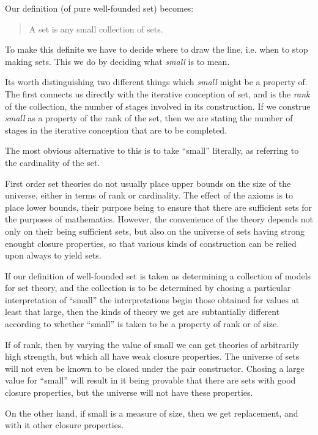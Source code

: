\documentclass[10pt,titlepage]{book}
\begin{document}
Our definition (of pure well-founded set) becomes:

\begin{quote}
A set is any small collection of sets.
\end{quote}

To make this definite we have to decide where to draw the line, i.e. when to stop making sets.
This we do by deciding what {\it small} is to mean.

Its worth distinguishing two different things which {\it small} might be a property of.
The first connects us directly with the iterative conception of set, and is the {\it rank} of the collection, the number of stages involved in its construction.
If we construe {\it small} as a property of the rank of the set, then we are stating the number of stages in the iterative conception that are to be completed.

The most obvious alternative to this is to take ``small'' literally, as referring to the cardinality of the set.

First order set theories do not usually place upper bounds on the size of the universe, either in terms of rank or cardinality.
The effect of the axioms is to place lower bounds, their purpose being to ensure that there are sufficient sets for the purposes of mathematics.
However, the convenience of the theory depends not only on their being sufficient sets, but also on the universe of sets having strong enought closure properties, so that various kinds of construction can be relied upon always to yield sets.

If our definition of well-founded set is taken as determining a collection of models for set theory, and the collection is to be determined by chosing a particular interpretation of ``small'' the interpretations begin those obtained for values at least that large, then the kinds of theory we get are subtantially different according to whether ``small'' is taken to be a property of rank or of size.

If of rank, then by varying the value of small we can get theories of arbitrarily high strength, but which all have weak closure properties.
The universe of sets will not even be known to be closed under the pair constructor.
Chosing a large value for ``small'' will result in it being provable that there are sets with good closure properties, but the universe will not have these properties.

On the other hand, if small is a measure of size, then we get replacement, and with it other closure properties. 
\end{document}

